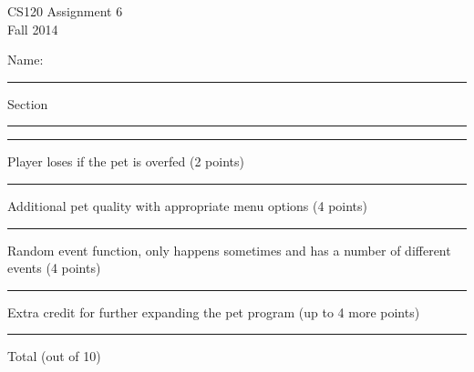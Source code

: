 \documentclass[12pt,openbib]{article}
\begin{document}
\thispagestyle{empty}
\vspace{-1.0in}
\large
\begin{center}
\textsf{CS120  Assignment 6}\\
\textsf{Fall 2014}
\end{center}
\vspace{-0.2in}
\large\textsf{Name: }\rule[-0.01in]{2.5in}{0.015in}
\hspace{0.5in} Section \rule[-0.01in]{1.0in}{0.015in}

\normalsize
\rm
\vspace{0.5in}
\rule[-0.01in]{0.5in}{0.015in} Player loses if the pet is overfed (2 points)
 
\rule[-0.01in]{0.5in}{0.015in} Additional pet quality with appropriate menu options (4 points)

\rule[-0.01in]{0.5in}{0.015in} Random event function, only happens sometimes and has a number of different events (4 points)

\rule[-0.01in]{0.5in}{0.015in} Extra credit for further expanding the pet program (up to 4 more points)

\rule[-0.01in]{0.5in}{0.015in} Total (out of 10)
\end{document}

